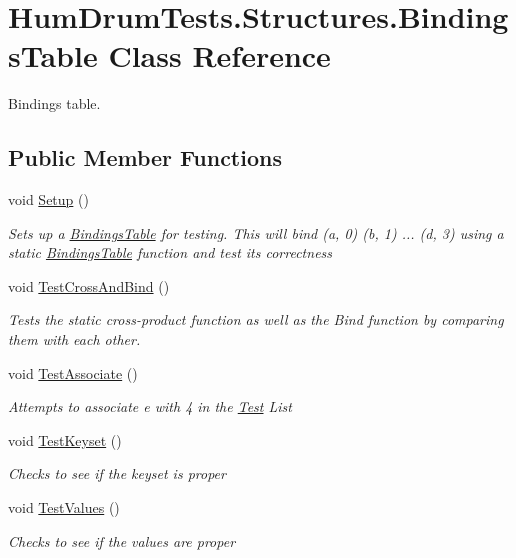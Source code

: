 \hypertarget{classHumDrumTests_1_1Structures_1_1BindingsTable}{}\section{Hum\+Drum\+Tests.\+Structures.\+Bindings\+Table Class Reference}
\label{classHumDrumTests_1_1Structures_1_1BindingsTable}


Bindings table.  


\subsection*{Public Member Functions}
\begin{DoxyCompactItemize}
\item 
void \hyperlink{classHumDrumTests_1_1Structures_1_1BindingsTable_a8f7bf1cc75542041214fe718611d8b69}{Setup} ()
\begin{DoxyCompactList}\small\item\em Sets up a \hyperlink{classHumDrumTests_1_1Structures_1_1BindingsTable}{Bindings\+Table} for testing. This will bind (a, 0) (b, 1) ... (d, 3) using a static \hyperlink{classHumDrumTests_1_1Structures_1_1BindingsTable}{Bindings\+Table} function and test its correctness \end{DoxyCompactList}\item 
void \hyperlink{classHumDrumTests_1_1Structures_1_1BindingsTable_a046e2ca67376cd1d8ff0d8f74dfe18cc}{Test\+Cross\+And\+Bind} ()
\begin{DoxyCompactList}\small\item\em Tests the static cross-\/product function as well as the Bind function by comparing them with each other. \end{DoxyCompactList}\item 
void \hyperlink{classHumDrumTests_1_1Structures_1_1BindingsTable_a3cd7bd49df2f9c6c1c5a92f1e698092a}{Test\+Associate} ()
\begin{DoxyCompactList}\small\item\em Attempts to associate e with 4 in the \hyperlink{classHumDrumTests_1_1Test}{Test} List \end{DoxyCompactList}\item 
void \hyperlink{classHumDrumTests_1_1Structures_1_1BindingsTable_a309a5aaf798eae7fb0c556d4f4c1122e}{Test\+Keyset} ()
\begin{DoxyCompactList}\small\item\em Checks to see if the keyset is proper \end{DoxyCompactList}\item 
void \hyperlink{classHumDrumTests_1_1Structures_1_1BindingsTable_aa5ef9d5cf93a0279597c67157699d02d}{Test\+Values} ()
\begin{DoxyCompactList}\small\item\em Checks to see if the values are proper \end{DoxyCompactList}\end{DoxyCompactItemize}


